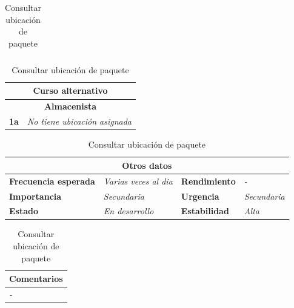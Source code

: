 \documentclass[12pt,spanish]{article}
\begin{document}
\begin{table}[H]
\begin{tabular}{|m{5pt}|m{15.5cm}|}
	\end{tabular}

	
	\vspace{0.5cm}
	
	\begin{tabular}{|m{12pt}|m{15.5cm}|}
		\hline
		\multicolumn{2}{|c|}{\textbf{Curso alternativo}} \\
		\hline
		\multicolumn{2}{|c|}{\textbf{Almacenista}} \\
		\hline
		\textbf{1a} & \textit{No tiene ubicación asignada}\\
		\hline
		
	\end{tabular}

	
	\vspace{0.5cm}
	
	\begin{tabular}{|m{3.75cm}|m{3.75cm}|m{3.75cm}|m{3.8cm}|}
		\hline
		\multicolumn{4}{|c|}{\textbf{Otros datos}} \\
		\hline
		\textbf{Frecuencia esperada} & \textit{Varias veces al dia} & \textbf{Rendimiento} & \textit{-} \\
		\hline
		\textbf{Importancia} & \textit{Secundaria} & \textbf{Urgencia} & \textit{Secundaria} \\
		\hline
		\textbf{Estado} & \textit{En desarrollo} & \textbf{Estabilidad} & \textit{Alta} \\
		\hline
	\end{tabular}
	
	\vspace{1cm}
	
	\begin{tabular}{|m{16.2cm}|}
		\hline
		\textbf{Comentarios} \\
		\hline
		\textit{-} \\
		\hline
	\end{tabular}
	
	\caption{Consultar ubicación de paquete}

\end{table}
\end{document}
